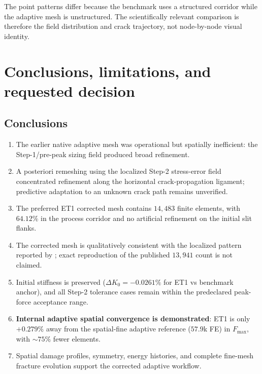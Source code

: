 \documentclass[10pt,a4paper]{article}
\begin{document}
The point patterns differ because the benchmark uses a structured corridor while the adaptive mesh is unstructured. The scientifically relevant comparison is therefore the field distribution and crack trajectory, not node-by-node visual identity.

\clearpage
\section{Conclusions, limitations, and requested decision}

\subsection{Conclusions}
\begin{enumerate}
  \item The earlier native adaptive mesh was operational but spatially inefficient: the Step-1/pre-peak sizing field produced broad refinement.
  \item A posteriori remeshing using the localized Step-2 stress-error field concentrated refinement along the horizontal crack-propagation ligament; predictive adaptation to an unknown crack path remains unverified.
  \item The preferred ET1 corrected mesh contains $14{,}483$ finite elements, with $64.12\%$ in the process corridor and no artificial refinement on the initial slit flanks.
  \item The corrected mesh is qualitatively consistent with the localized pattern reported by \citet{pandey2025}; exact reproduction of the published $13{,}941$ count is not claimed.
  \item Initial stiffness is preserved ($\Delta K_0=-0.0261\%$ for ET1 vs benchmark anchor), and all Step-2 tolerance cases remain within the predeclared peak-force acceptance range.
  \item \textbf{Internal adaptive spatial convergence is demonstrated}: ET1 is only \textbf{$+0.279\%$} away from the spatial-fine adaptive reference ($57.9$k FE) in $F_{\max}$, with $\sim75\%$ fewer elements.
  \item Spatial damage profiles, symmetry, energy histories, and complete fine-mesh fracture evolution support the corrected adaptive workflow.
\end{enumerate}
\end{document}
